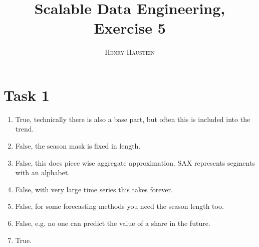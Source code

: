 \documentclass{article}
\title{\textbf{Scalable Data Engineering, Exercise 5}}
\author{\textsc{Henry Haustein}}
\date{}
\begin{document}
	\maketitle
	
	\section*{Task 1}
	\begin{enumerate}[label=(\alph*)]
		\item True, technically there is also a base part, but often this is included into the trend.
		\item False, the season mask is fixed in length.
		\item False, this does piece wise aggregate approximation. SAX represents segments with an alphabet.
		\item False, with very large time series this takes forever.
		\item False, for some forecasting methods you need the season length too.
		\item False, e.g. no one can predict the value of a share in the future.
		\item True.
	\end{enumerate}
\end{document}
